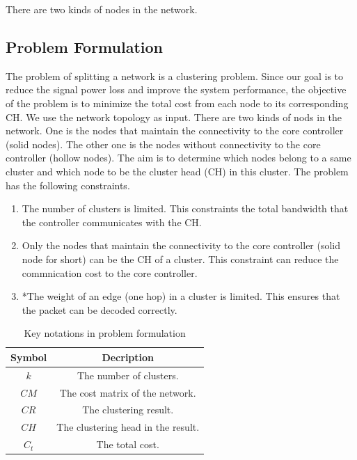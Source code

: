 \documentclass[conference]{IEEEtran}
\begin{document}
There are two kinds of nodes in the network.

\subsection{Problem Formulation}

The problem of splitting a network is a clustering problem. Since our goal is to reduce the signal power loss and improve the system performance, the objective of the problem is to minimize the total cost from each node to its corresponding CH. We use the network topology as input. There are two kinds of nods in the network. One is the nodes that maintain the connectivity to the core controller (solid nodes). The other one is the nodes without connectivity to the core controller (hollow nodes). The aim is to determine which nodes belong to a same cluster and which node to be the cluster head (CH) in this cluster. The problem has the following constraints.
\begin{enumerate}
\item The number of clusters is limited. This constraints the total bandwidth that the controller communicates with the CH. 
\item Only the nodes that maintain the connectivity to the core controller (solid node for short) can be the CH of a cluster. This constraint can reduce the commnication cost to the core controller.
\item *The weight of an edge (one hop) in a cluster is limited. This ensures that the packet can be decoded correctly.
\end{enumerate}

\begin{table}[htbp]
\centering
\begin{tabular}{|c||c|}
\hline
Symbol & Decription\\
\hline
$k$ & The number of clusters.\\
\hline
$CM$ & The cost matrix of the network.\\
\hline
$CR$ & The clustering result.\\
\hline
$CH$ & The clustering head in the result.\\
\hline
$C_t$ & The total cost.\\
\hline
\end{tabular}
\caption{Key notations in problem formulation}
\label{notations}
\end{table} 
\end{document}
